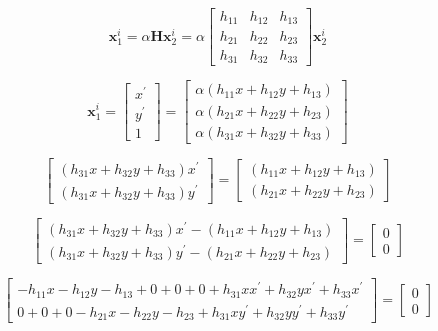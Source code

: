 \documentclass[12pt]{article}
\begin{document}
$$
\textbf{x}^{i}_{1}=
\alpha
\textbf{H}
\textbf{x}^{i}_{2}
=
\alpha
\begin{bmatrix}
h_{11} & h_{12} & h_{13} \\
h_{21} & h_{22} & h_{23} \\
h_{31} & h_{32} & h_{33} 
\end{bmatrix}
\textbf{x}^{i}_{2}
$$

$$
\textbf{x}^{i}_{1}=
\begin{bmatrix}
x^{ \prime } \\ y ^ { \prime } \\ 1
\end{bmatrix}
=
\begin{bmatrix}
\alpha ( h_{11} x + h_{12} y + h_{13} ) \\
\alpha ( h_{21} x + h_{22} y + h_{23} ) \\
\alpha ( h_{31} x + h_{32} y + h_{33} )
\end{bmatrix}
$$

$$
\begin{bmatrix}
( h_{31} x + h_{32} y + h_{33} ) x^{ \prime } \\ 
( h_{31} x + h_{32} y + h_{33} ) y^ { \prime } 
\end{bmatrix}
=
\begin{bmatrix}
( h_{11} x + h_{12} y + h_{13} ) \\
( h_{21} x + h_{22} y + h_{23} )
\end{bmatrix}
$$

$$
\begin{bmatrix}
( h_{31} x + h_{32} y + h_{33} ) x^{ \prime } - ( h_{11} x + h_{12} y + h_{13} ) \\
( h_{31} x + h_{32} y + h_{33} ) y^{ \prime } - ( h_{21} x + h_{22} y + h_{23} )
\end{bmatrix}
=
\begin{bmatrix}
0 \\ 0
\end{bmatrix}
$$

$$
\begin{bmatrix}
- h_{11} x 
- h_{12} y 
- h_{13}
+ 0 + 0 + 0
+ h_{31} x  x^{ \prime }
+ h_{32} y  x^{ \prime }
+ h_{33} x^{ \prime }   \\
0 + 0 + 0
- h_{21} x 
- h_{22} y 
- h_{23}
+ h_{31} x y^{ \prime } 
+ h_{32} y y^{ \prime } 
+ h_{33}   y^{ \prime } 
\end{bmatrix}
=
\begin{bmatrix}
0 \\ 0
\end{bmatrix}
$$
\end{document}
